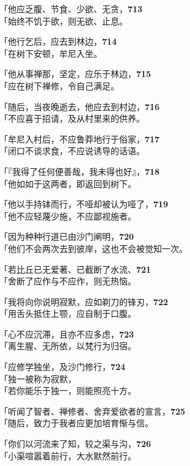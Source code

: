 「他应乏腹、节食、少欲、无贪，\hfill{\grayfootnotesize \textbf{713}} \\
「始终不饥于欲，则无欲、止息。


「他行乞后，应去到林边，\hfill{\grayfootnotesize \textbf{714}} \\
「在树下安顿，牟尼入坐。


「他从事禅那，坚定，应乐于林边，\hfill{\grayfootnotesize \textbf{715}} \\
「应在树下禅修，令自己满足。


「随后，当夜晚逝去，他应去到村边，\hfill{\grayfootnotesize \textbf{716}} \\
「不应喜于招请，及从村里来的供养。


「牟尼入村后，不应鲁莽地行于俗家，\hfill{\grayfootnotesize \textbf{717}} \\
「闭口不谈求食，不应说诱导的话语。


「『我得了任何便善哉，我未得也好』，\hfill{\grayfootnotesize \textbf{718}} \\
「他如如于这两者，即返回到树下。


「他以手持钵而行，不哑却被认为哑了，\hfill{\grayfootnotesize \textbf{719}} \\
「他不应轻蔑少施，不应鄙视施者。


「因为种种行道已由沙门阐明，\hfill{\grayfootnotesize \textbf{720}} \\
「他们不会两次去到彼岸，这也不会被觉知一次。


「若比丘已无爱著、已截断了水流、\hfill{\grayfootnotesize \textbf{721}} \\
「舍断了应作与不应作，则无热恼。


「我将向你说明寂默，应如剃刀的锋刃，\hfill{\grayfootnotesize \textbf{722}} \\
「用舌头抵住上颚，应自制于口腹。


「心不应沉滞，且亦不应多虑，\hfill{\grayfootnotesize \textbf{723}} \\
「离生腥、无所依，以梵行为归宿。


「应修学独坐，及沙门修行，\hfill{\grayfootnotesize \textbf{724}} \\
「独一被称为寂默，\\
「若你能乐于独一，则能照亮十方。


「听闻了智者、禅修者、舍弃爱欲者的宣言，\hfill{\grayfootnotesize \textbf{725}} \\
「随后，致力于我者应更加培育惭与信。


「你们以河流来了知，较之渠与沟，\hfill{\grayfootnotesize \textbf{726}} \\
「小渠喧嚣着前行，大水默然前行。


